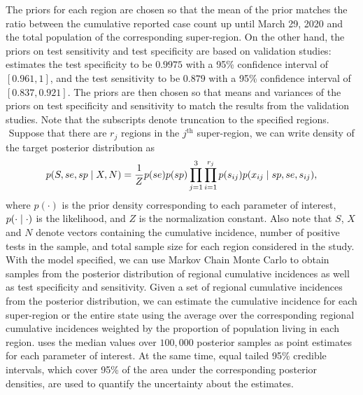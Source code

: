 The priors for each region are chosen so that the mean of the prior matches the ratio between the cumulative reported case count up until March 29, 2020 and the total population of the corresponding super-region. On the other hand, the priors on test sensitivity and test specificity are based on validation studies: \cite{rosenberg2020cumulative} estimates the test specificity to be $0.9975$ with a 95\% confidence interval of $[0.961, 1]$, and the test sensitivity to be $0.879$ with a 95\% confidence interval of $[0.837, 0.921]$. The priors are then chosen so that means and variances of the priors on test specificity and sensitivity to match the results from the validation studies. Note that the subscripts denote truncation to the specified regions.\\
\newline$ $
Suppose that there are $r_j$ regions in the $j^\text{th}$ super-region, we can write density of the target posterior distribution as
\[
p(S, se, sp \mid X, N) = \frac{1}{Z}p(se)p(sp)\prod_{j=1}^3\prod_{i=1}^{r_j} p(s_{ij})p(x_{ij}\mid sp, se, s_{ij}),
\]
where $p(\cdot)$ is the prior density corresponding to each parameter of interest, $p(\cdot \mid \cdot)$ is the likelihood, and $Z$ is the normalization constant. Also note that $S$, $X$ and $N$ denote vectors containing the cumulative incidence, number of positive tests in the sample, and total sample size for each region considered in the study. With the model specified, we can use Markov Chain Monte Carlo to obtain samples from the posterior distribution of regional cumulative incidences as well as test specificity and sensitivity. Given a set of regional cumulative incidences from the posterior distribution, we can estimate the cumulative incidence for each super-region or the entire state using the average over the corresponding regional cumulative incidences weighted by the proportion of population living in each region. \cite{meyer2022adjusting} uses the median values over $100,000$ posterior samples as point estimates for each parameter of interest. At the same time, equal tailed 95\% credible intervals, which cover 95\% of the area under the corresponding posterior densities, are used to quantify the uncertainty about the estimates.
